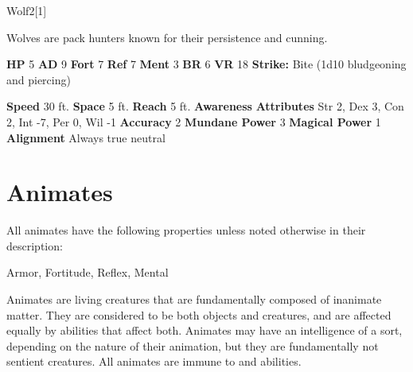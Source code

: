   
  \begin{monsection}{Wolf}{2}[1]
    \vspace{-1em}\vspace{-1em}
    \vspace{0em}

    
        Wolves are pack hunters known for their persistence and cunning.
      

    \begin{spellcontent}
      \begin{spelltargetinginfo}
        \pari \textbf{HP} 5 \monsep
          \textbf{AD} 9 \monsep
          \textbf{Fort} 7 \monsep
          \textbf{Ref} 7 \monsep
          \textbf{Ment} 3
        \pari \textbf{BR} 6 \monsep
        \textbf{VR} 18
        \pari \textbf{Strike:}
            Bite  (1d10 bludgeoning and piercing)
      \end{spelltargetinginfo}
    \end{spellcontent}
    \begin{monsterfooter}
      \pari \textbf{Speed} 30 ft. \monsep
        \textbf{Space} 5 ft. \monsep
        \textbf{Reach} 5 ft.
      \pari \textbf{Awareness} 
      \pari \textbf{Attributes}
        Str 2, Dex 3,
        Con 2, Int -7,
        Per 0, Wil -1
      \pari \textbf{Accuracy} 2 \monsep
        \textbf{Mundane Power} 3 \monsep
      \textbf{Magical Power} 1
      \pari \textbf{Alignment} Always true neutral
    \end{monsterfooter}
  \end{monsection}
  
  
        \newpage
        \section{Animates}

        All animates have the following properties unless noted otherwise in their description:
        
    
     Armor,
     Fortitude,
     Reflex,
     Mental
  
     Animates are living creatures that are fundamentally composed of inanimate matter.
    They are considered to be both objects and creatures, and are affected equally by abilities that affect both.
     Animates may have an intelligence of a sort, depending on the nature of their animation, but they are fundamentally not sentient creatures.
    All animates are immune to  and  abilities.
  
